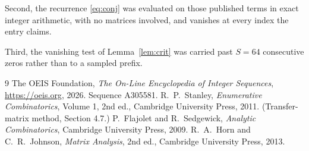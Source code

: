 \documentclass[11pt,a4paper]{article}
\theoremstyle{plain}
\theoremstyle{definition}
\begin{document}
Second, the recurrence \eqref{eq:conj} was evaluated on those published terms in exact
integer arithmetic, with no matrices involved, and vanishes at every index the entry claims.

Third, the vanishing test of Lemma~\ref{lem:crit} was carried past $S=64$ consecutive
zeros rather than to a sampled prefix.

\begin{thebibliography}{9}
 The OEIS Foundation, \emph{The On-Line Encyclopedia of Integer
Sequences}, \url{https://oeis.org}, 2026. Sequence A305581.
 R.~P.~Stanley, \emph{Enumerative Combinatorics}, Volume 1, 2nd ed.,
Cambridge University Press, 2011. (Transfer-matrix method, Section 4.7.)
 P.~Flajolet and R.~Sedgewick, \emph{Analytic Combinatorics}, Cambridge
University Press, 2009.
 R.~A.~Horn and C.~R.~Johnson, \emph{Matrix Analysis}, 2nd ed., Cambridge
University Press, 2013.
\end{thebibliography}
\end{document}
